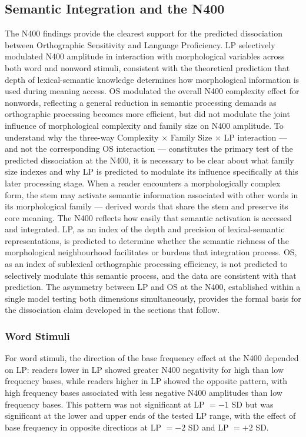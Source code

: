 \documentclass[utf8]{FrontiersinHarvard} %
\begin{document}
	\subsection{Semantic Integration and the N400}
	
	The N400 findings provide the clearest support for the predicted dissociation between Orthographic Sensitivity and Language Proficiency. LP selectively modulated N400 amplitude in interaction with morphological variables across both word and nonword stimuli, consistent with the theoretical prediction that depth of lexical-semantic knowledge determines how morphological information is used during meaning access. OS modulated the overall N400 complexity effect for nonwords, reflecting a general reduction in semantic processing demands as orthographic processing becomes more efficient, but did not modulate the joint influence of morphological complexity and family size on N400 amplitude. To understand why the three-way Complexity $\times$ Family Size $\times$ LP interaction --- and not the corresponding OS interaction --- constitutes the primary test of the predicted dissociation at the N400, it is necessary to be clear about what family size indexes and why LP is predicted to modulate its influence specifically at this later processing stage. When a reader encounters a morphologically complex form, the stem may activate semantic information associated with other words in its morphological family --- derived words that share the stem and preserve its core meaning. The N400 reflects how easily that semantic activation is accessed and integrated. LP, as an index of the depth and precision of lexical-semantic representations, is predicted to determine whether the semantic richness of the morphological neighbourhood facilitates or burdens that integration process. OS, as an index of sublexical orthographic processing efficiency, is not predicted to selectively modulate this semantic process, and the data are consistent with that prediction. The asymmetry between LP and OS at the N400, established within a single model testing both dimensions simultaneously, provides the formal basis for the dissociation claim developed in the sections that follow.
	
	\subsubsection{Word Stimuli}
	
	For word stimuli, the direction of the base frequency effect at the N400 depended on LP: readers lower in LP showed greater N400 negativity for high than low frequency bases, while readers higher in LP showed the opposite pattern, with high frequency bases associated with less negative N400 amplitudes than low frequency bases. This pattern was not significant at LP $= -1$ SD but was significant at the lower and upper ends of the tested LP range, with the effect of base frequency in opposite directions at LP $= -2$ SD and LP $= +2$ SD.
	
\end{document}
